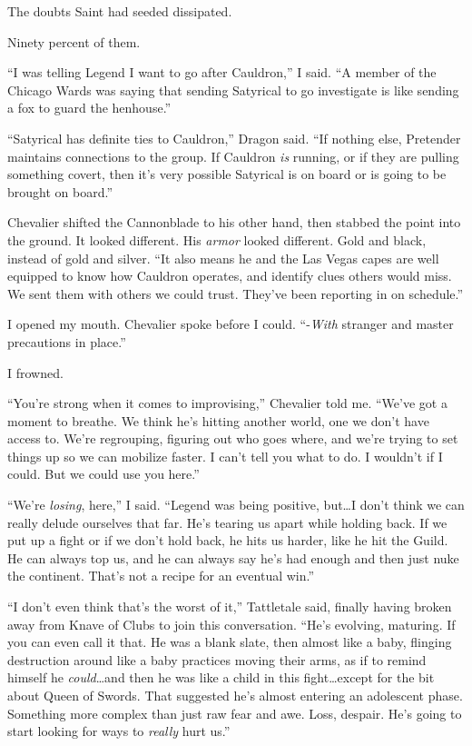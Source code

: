The doubts Saint had seeded dissipated.



Ninety percent of them.



``I was telling Legend I want to go after Cauldron,'' I said.  ``A member of the Chicago Wards was saying that sending Satyrical to go investigate is like sending a fox to guard the henhouse.''



``Satyrical has definite ties to Cauldron,'' Dragon said.  ``If nothing else, Pretender maintains connections to the group.  If Cauldron \emph{is} running, or if they are pulling something covert, then it's very possible Satyrical is on board or is going to be brought on board.''



Chevalier shifted the Cannonblade to his other hand, then stabbed the point into the ground.  It looked different.  His \emph{armor} looked different.  Gold and black, instead of gold and silver.  ``It also means he and the Las Vegas capes are well equipped to know how Cauldron operates, and identify clues others would miss.  We sent them with others we could trust.  They've been reporting in on schedule.''



I opened my mouth.  Chevalier spoke before I could.  ``-\emph{With }stranger and master precautions in place.''



I frowned.



``You're strong when it comes to improvising,'' Chevalier told me.  ``We've got a moment to breathe.  We think he's hitting another world, one we don't have access to.  We're regrouping, figuring out who goes where, and we're trying to set things up so we can mobilize faster.  I can't tell you what to do.  I wouldn't if I could.  But we could use you here.''



``We're \emph{losing}, here,'' I said.  ``Legend was being positive, but\ldots I don't think we can really delude ourselves that far.  He's tearing us apart while holding back.  If we put up a fight or if we don't hold back, he hits us harder, like he hit the Guild.  He can always top us, and he can always say he's had enough and then just nuke the continent.  That's not a recipe for an eventual win.''



``I don't even think that's the worst of it,'' Tattletale said, finally having broken away from Knave of Clubs to join this conversation.  ``He's evolving, maturing.  If you can even call it that.  He was a blank slate, then almost like a baby, flinging destruction around like a baby practices moving their arms, as if to remind himself he \emph{could}\ldots and then he was like a child in this fight\ldots except for the bit about Queen of Swords.  That suggested he's almost entering an adolescent phase.  Something more complex than just raw fear and awe.  Loss, despair.  He's going to start looking for ways to \emph{really} hurt us.''



